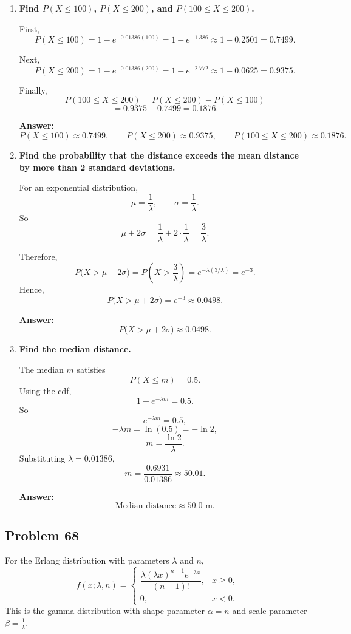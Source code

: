 \documentclass[11pt]{article}
\begin{document}
\begin{enumerate}
    \item[(a)] \textbf{Find $P(X\le 100)$, $P(X\le 200)$, and $P(100\le X\le 200)$.}

    First,
    \[
    P(X\le 100)=1-e^{-0.01386(100)}=1-e^{-1.386}\approx 1-0.2501=0.7499.
    \]

    Next,
    \[
    P(X\le 200)=1-e^{-0.01386(200)}=1-e^{-2.772}\approx 1-0.0625=0.9375.
    \]

    Finally,
    \[
    P(100\le X\le 200)=P(X\le 200)-P(X\le 100)
    \]
    \[
    =0.9375-0.7499=0.1876.
    \]

    \textbf{Answer:}
    \[
    P(X\le 100)\approx 0.7499,\qquad
    P(X\le 200)\approx 0.9375,\qquad
    P(100\le X\le 200)\approx 0.1876.
    \]

    \item[(b)] \textbf{Find the probability that the distance exceeds the mean distance by more than 2 standard deviations.}

    For an exponential distribution,
    \[
    \mu=\frac{1}{\lambda}, \qquad \sigma=\frac{1}{\lambda}.
    \]
    So
    \[
    \mu+2\sigma=\frac{1}{\lambda}+2\cdot \frac{1}{\lambda}=\frac{3}{\lambda}.
    \]

    Therefore,
    \[
    P\bigl(X>\mu+2\sigma\bigr)=P\left(X>\frac{3}{\lambda}\right)=e^{-\lambda(3/\lambda)}=e^{-3}.
    \]
    Hence,
    \[
    P\bigl(X>\mu+2\sigma\bigr)=e^{-3}\approx 0.0498.
    \]

    \textbf{Answer:}
    \[
    P\bigl(X>\mu+2\sigma\bigr)\approx 0.0498.
    \]

    \item[(c)] \textbf{Find the median distance.}

    The median $m$ satisfies
    \[
    P(X\le m)=0.5.
    \]
    Using the cdf,
    \[
    1-e^{-\lambda m}=0.5.
    \]
    So
    \[
    e^{-\lambda m}=0.5,
    \]
    \[
    -\lambda m=\ln(0.5)=-\ln 2,
    \]
    \[
    m=\frac{\ln 2}{\lambda}.
    \]
    Substituting $\lambda=0.01386$,
    \[
    m=\frac{0.6931}{0.01386}\approx 50.01.
    \]

    \textbf{Answer:}
    \[
    \text{Median distance} \approx 50.0\text{ m}.
    \]
\end{enumerate}

\subsection*{Problem 68}

For the Erlang distribution with parameters $\lambda$ and $n$,
\[
f(x;\lambda,n)=
\begin{cases}
\dfrac{\lambda(\lambda x)^{n-1}e^{-\lambda x}}{(n-1)!}, & x\ge 0,\\[1ex]
0, & x<0.
\end{cases}
\]
This is the gamma distribution with shape parameter $\alpha=n$ and scale parameter $\beta=\frac{1}{\lambda}$.
\end{document}
